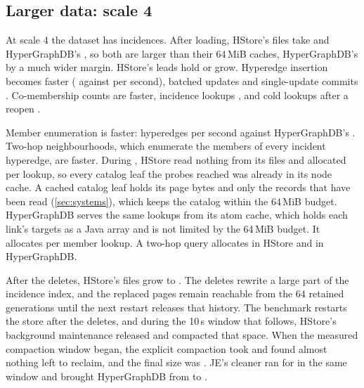\subsection{Larger data: scale 4}
\label{sec:scale4}

At scale 4 the dataset has  incidences. After loading, HStore's files take  and HyperGraphDB's , so both are larger than their 64\,MiB caches, HyperGraphDB's by a much wider margin. HStore's leads hold or grow. Hyperedge insertion becomes  faster ( against  per second), batched updates  and single-update commits . Co-membership counts are  faster, incidence lookups , and cold lookups after a reopen .

Member enumeration is  faster:  hyperedges per second against HyperGraphDB's . Two-hop neighbourhoods, which enumerate the members of every incident hyperedge, are  faster. During , HStore read nothing from its files and allocated  per lookup, so every catalog leaf the probes reached was already in its node cache. A cached catalog leaf holds its page bytes and only the records that have been read (\cref{sec:systems}), which keeps the catalog within the 64\,MiB budget. HyperGraphDB serves the same lookups from its atom cache, which holds each link's targets as a Java array and is not limited by the 64\,MiB budget. It allocates  per member lookup. A two-hop query allocates  in HStore and  in HyperGraphDB.

After the deletes, HStore's files grow to . The deletes rewrite a large part of the incidence index, and the replaced pages remain reachable from the 64 retained generations until the next restart releases that history. The benchmark restarts the store after the deletes, and during the 10\,s  window that follows, HStore's background maintenance released and compacted that space. When the measured compaction window began, the explicit compaction took  and found almost nothing left to reclaim, and the final size was . JE's cleaner ran for  in the same window and brought HyperGraphDB from  to .

